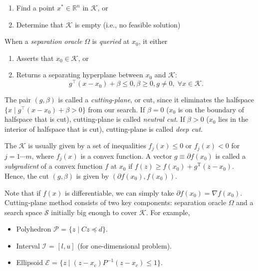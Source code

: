 \documentclass[final,leqno]{siamltex}
\providecommand{\tightlist}{%
  \setlength{\itemsep}{0pt}\setlength{\parskip}{0pt}}
\begin{document}
\begin{enumerate}
\def\labelenumi{\arabic{enumi}.}
\tightlist
\item
  Find a point \(x^* \in \mathbb{R}^n\) in \(\mathcal{K}\), or
\item
  Determine that \(\mathcal{K}\) is empty (i.e., no feasible solution)
\end{enumerate}

When a \emph{separation oracle} \(\Omega\) is \emph{queried} at \(x_0\), it either

\begin{enumerate}
\def\labelenumi{\arabic{enumi}.}
\tightlist
\item
  Asserts that \(x_0 \in \mathcal{K}\), or
\item
  Returns a separating hyperplane between \(x_0\) and \(\mathcal{K}\):
  \begin{equation}g^\top (x - x_0) + \beta \leq 0, \beta \geq 0, g \neq 0, \; \forall x \in \mathcal{K}.\label{eq:cut}\end{equation}
\end{enumerate}

The pair \((g, \beta)\) is called a \emph{cutting-plane}, or cut, since it eliminates the halfspace \(\{x \mid g^\top (x - x_0) + \beta > 0\}\) from our search. If \(\beta=0\) (\(x_0\) is on the boundary of halfspace that is cut), cutting-plane is called \emph{neutral cut}. If \(\beta>0\) (\(x_0\) lies in the interior of halfspace that is cut), cutting-plane is called \emph{deep cut}.

The \(\mathcal{K}\) is usually given by a set of inequalities \(f_j(x) \le 0\) or \(f_j(x) < 0\) for \(j = 1 \cdots m\), where \(f_j(x)\) is a convex function. A vector \(g \equiv \partial f(x_0)\) is called a \emph{subgradient} of a convex function \(f\) at \(x_0\) if \(f(z) \geq f(x_0) + g^\mathrm{T} (z - x_0)\). Hence, the cut \((g, \beta)\) is given by \((\partial f(x_0), f(x_0))\).

Note that if \(f(x)\) is differentiable, we can simply take \(\partial f(x_0) = \nabla f(x_0)\). Cutting-plane method consists of two key components: separation oracle \(\Omega\) and a search space \(\mathcal{S}\) initially big enough to cover \(\mathcal{K}\). For example,

\begin{itemize}
\tightlist
\item
  Polyhedron \(\mathcal{P}\) = \(\{z \mid C z \preceq d \}\).
\item
  Interval \(\mathcal{I}\) = \([l, u]\) (for one-dimensional problem).
\item
  Ellipsoid \(\mathcal{E}\) = \(\{z \mid (z-x_c)P^{-1}(z-x_c) \leq 1 \}\).
\end{itemize}
\end{document}
